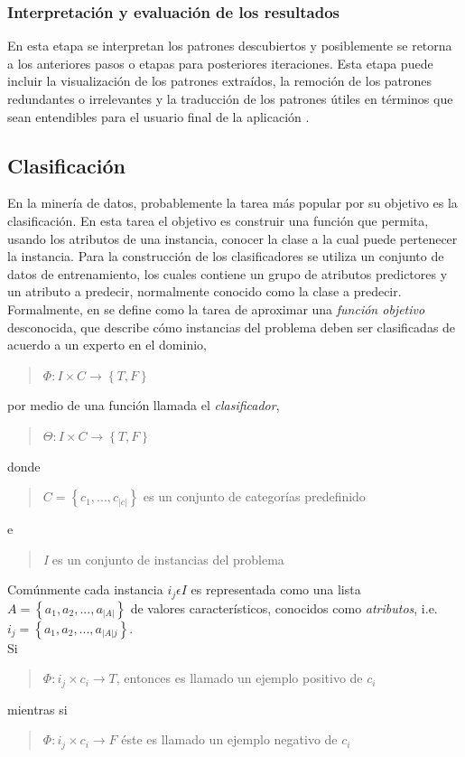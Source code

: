 \subsubsection{Interpretación y evaluación de los resultados \cite{key-50,key-100}}
En esta etapa se interpretan los patrones descubiertos y posiblemente se retorna a los anteriores pasos o etapas para posteriores iteraciones. Esta etapa puede incluir la visualización de los patrones extraídos, la remoción de los patrones redundantes o irrelevantes y la traducción de los patrones útiles en términos que sean entendibles para el usuario final de la aplicación \cite{key-100}.
\subsection{Clasificación}
En la minería de datos, probablemente la tarea más popular por su objetivo es la clasificación. En esta tarea el objetivo es construir una función que permita, usando los atributos de una instancia, conocer la clase a la cual puede pertenecer la instancia. Para la construcción de los clasificadores se utiliza un conjunto de datos de entrenamiento, los cuales contiene un grupo de atributos predictores y un atributo a predecir, normalmente conocido como la clase a predecir. \\
Formalmente, en \cite{key-70} se define como la tarea de aproximar una \emph{función objetivo} desconocida, que describe cómo instancias del problema deben ser clasificadas
de acuerdo a un experto en el dominio, \begin{quote}$\Phi:I\times C\rightarrow\left\{ T,F\right\} $\end{quote}
 por medio de una función llamada el \emph{clasificador}, \begin{quote}
$\Theta:I\times C\rightarrow\left\{ T,F\right\} $
\end{quote} 
 donde \begin{quote}
 $C=\left\{ c_{1},...,c_{|c|}\right\} $ es un conjunto de categorías predefinido\end{quote}
 e \begin{quote}\emph{I} es un conjunto
de instancias del problema\end{quote} Comúnmente cada instancia $i_{j}\epsilon I$
es representada como una lista $A=\left\{ a_{1},a_{2},...,a_{|A|}\right\} $
de valores característicos, conocidos como \emph{atributos}, i.e.
$i_{j}=\left\{ a_{1},a_{2},...,a_{|A|j}\right\} $. \\Si \begin{quote}$\Phi:i_{j}\times c_{i}\rightarrow T$,
entonces es llamado un ejemplo positivo de $c_{i}$ \end{quote} mientras si \begin{quote}$\Phi:i_{j}\times c_{i}\rightarrow F$
éste es llamado un ejemplo negativo de $c_{i}$\end{quote}

